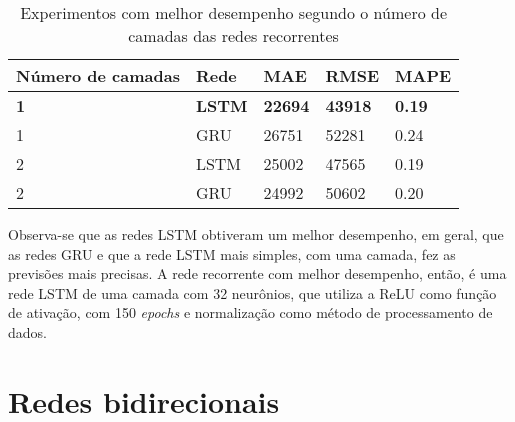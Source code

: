 \begin{table}[H]
    \centering
    \caption{Experimentos com melhor desempenho segundo o número de camadas das redes recorrentes}
    \begin{tabular}{lllll}
    \toprule
    Número de camadas & Rede & MAE & RMSE & MAPE \\
    \midrule
    \textbf{1} & \textbf{LSTM} & \textbf{22694}  & \textbf{43918} & \textbf{0.19}\\
    1 & GRU  & 26751  & 52281  & 0.24 \\
    2 & LSTM & 25002  & 47565 & 0.19  \\
    2 & GRU  & 24992  & 50602  & 0.20 \\
    \bottomrule
    \end{tabular}
    \label{tab:res-rnn}
\end{table}

Observa-se que as redes LSTM obtiveram um melhor desempenho, em geral, que as
redes GRU e que a rede LSTM mais simples, com uma camada, fez as previsões 
mais precisas. A rede recorrente com melhor desempenho, então, é uma rede LSTM 
de uma camada com 32 neurônios, que utiliza a ReLU como função de ativação, com 
150 \textit{epochs} e normalização como método de processamento de dados.

\section{Redes bidirecionais}

